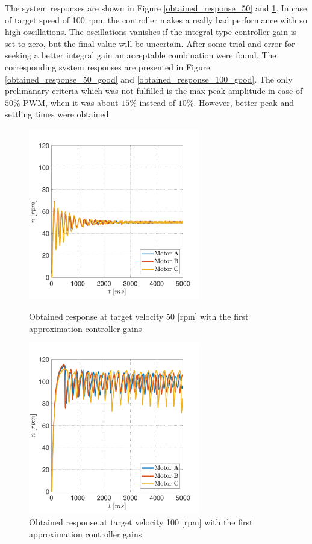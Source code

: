 \documentclass[12pt,english,twoside]{article}
\begin{document}
The system responses are shown in Figure \ref{obtained_response_50} and \ref{obtained_response_100}. In case of target speed of 100 rpm, the controller makes a really bad performance with so high oscillations. The oscillations vanishes if the integral type controller gain is set to zero, but the final value will be uncertain. After some trial and error for seeking a better integral gain an acceptable combination were found. The corresponding system responses are presented in Figure  \ref{obtained_response_50_good} and \ref{obtained_response_100_good}. The only prelimanary criteria which was not fulfilled is the max peak amplitude in case of $50\%$ PWM, when it was about $15\%$ instead of $10\%$. However, better peak and settling times were obtained.
\newpage
\begin{figure}[htb!]
	\centering
	\centering
	\includegraphics[height=7.5cm]{figures/controlled_50_p_02_i_11}
	\caption{Obtained response at target velocity 50 [rpm] with the first approximation controller gains}
	\label{obtained_response_50}
	\endminipage\hfill
	\centering
	\includegraphics[height=7.5cm]{figures/controlled_100_p_02_i_11}
	\caption{Obtained response at target velocity 100 [rpm] with the first approximation controller gains}
	\label{obtained_response_100}
	\endminipage\hfill
\end{figure}
\end{document}
